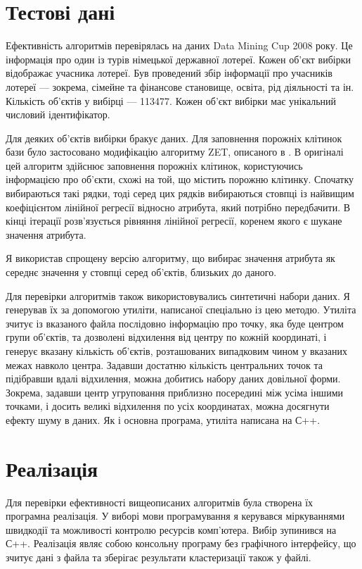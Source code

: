     \section {Тестові дані}
        Ефективність алгоритмів перевірялась на даних Data Mining Cup 2008 року. Це інформація про один із турів німецької державної лотереї. Кожен об'єкт вибірки відображає учасника лотереї. Був проведений збір інформації про учасників лотереї --- зокрема, сімейне та фінансове становище, освіта, рід діяльності та ін. Кількість об'єктів у вибірці --- 113477. Кожен об'єкт вибірки має унікальний числовий ідентифікатор.
        
        Для деяких об'єктів вибірки бракує даних. Для заповнення порожніх клітинок бази було застосовано модифікацію алгоритму ZET, описаного в \cite{Zagorujko}. В оригіналі цей алгоритм здійснює заповнення порожніх клітинок, користуючись інформацією про об'єкти, схожі на той, що містить порожню клітинку. Спочатку вибираються такі рядки, тоді серед цих рядків вибираються стовпці із найвищим коефіцієнтом лінійної регресії відносно атрибута, який потрібно передбачити. В кінці ітерації розв'язується рівняння лінійної регресії, коренем якого є шукане значення атрибута.
        
        Я використав спрощену версію алгоритму, що вибирає значення атрибута як середнє значення у стовпці серед об'єктів, близьких до даного.
        
        Для перевірки алгоритмів також використовувались синтетичні набори даних. Я генерував їх за допомогою утиліти, написаної спеціально із цею методю. Утиліта зчитує із вказаного файла послідовно інформацію про точку, яка буде центром групи об'єктів, та дозволені відхилення від центру по кожній координаті, і генерує вказану кількість об'єктів, розташованих випадковим чином у вказаних межах навколо центра. Задавши достатню кількість центральних точок та підібравши вдалі відхилення, можна добитись набору даних довільної форми. Зокрема, задавши центр угруповання приблизно посередині між усіма іншими точками, і досить великі відхилення по усіх координатах, можна досягнути ефекту шуму в даних. Як і основна програма, утиліта написана на С++.
            
    \section {Реалізація}
        Для перевірки ефективності вищеописаних алгоритмів була створена їх програмна реалізація. У виборі мови програмування я керувався міркуваннями швидкодії та можливості контролю ресурсів комп'ютера. Вибір зупинився на С++. Реалізація являє собою консольну програму без графічного інтерфейсу, що зчитує дані з файла та зберігає результати кластеризації також у файлі.
        
